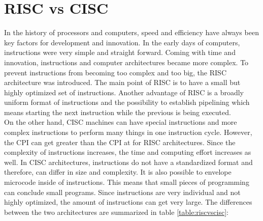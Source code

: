 \section{RISC vs CISC}
In the history of processors and computers, speed and efficiency have always been key factors for development and innovation. In the early days of computers, instructions were very simple and straight forward. Coming with time and innovation, instructions and computer architectures became more complex. To prevent instructions from becoming too complex and too big, the \acf{RISC} architecture was introduced. The main point of RISC is to have a small but highly optimized set of instructions. Another advantage of RISC is a broadly uniform format of instructions and the possibility to establish pipelining which means starting the next instruction while the previous is being executed.\\
On the other hand, \acf{CISC} machines can have special instructions and more complex instructions to perform many things in one instruction cycle. However, the CPI can get greater than the CPI at for RISC architectures. Since the complexity of instructions increases, the time and computing effort increases as well. In CISC architectures, instructions do not have a standardized format and therefore, can differ in size and complexity. It is also possible to envelope microcode inside of instructions. This means that small pieces of programming can conclude small programs. Since instructions are very individual and not highly optimized, the amount of instructions can get very large. The differences between the two architectures are summarized in table \ref{table:riscvscisc}:
\begin{table}[H]
	\setlength\arrayrulewidth{2pt}
	\centering
	\caption{RISC vs CISC \cite{hellmann2013}}
	\label{table:riscvscisc}
\end{table}

